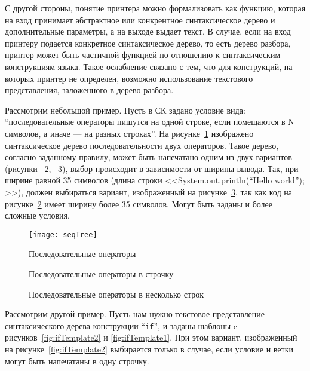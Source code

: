 С другой стороны, понятие принтера можно формализовать как функцию,
которая на вход принимает
абстрактное или конкрентное синтаксическое дерево и дополнительные параметры,
а на выходе выдает текст. В случае, если на вход принтеру подается конкретное
синтаксическое дерево, то есть дерево разбора, принтер может быть частичной
функцией по отношению к синтаксическим конструкциям языка.
Такое ослабление связано
с тем, что для конструкций, на которых принтер не определен, возможно использование
текстового представления, заложенного в дерево разбора.

Рассмотрим небольшой пример.
Пусть в СК задано условие вида: “последовательные операторы пишутся
на одной строке,
если помещаются в N символов, а иначе --- на разных строках”.
На рисунке~\ref{fig:seqImage} изображено синтаксическое дерево
последовательности двух операторов. Такое дерево, согласно заданному
правилу, может быть напечатано одним из
двух вариантов (рисунки ~\ref{fig:seqCode1}, ~\ref{fig:seqCode2}),
выбор происходит в зависимости от ширины вывода. Так, при ширине равной
35 символов (длина строки <<System.out.println(“Hello world”); >>),
должен выбираться вариант, изображенный на рисунке~\ref{fig:seqCode2},
так как код на рисунке~\ref{fig:seqCode1} имеет ширину более 35 символов.
Могут быть заданы и более сложные условия.

\begin{figure}[h!]
	\centering
	\texttt{[image: seqTree]}
	\caption{Последовательные операторы}
	\label{fig:seqImage}
\end{figure}

\begin{figure}[h!]
	\centering
	
	\caption{Последовательные операторы в строчку}
	\label{fig:seqCode1}
\end{figure}

\begin{figure}[h!]
	\centering
	
	\caption{Последовательные операторы в несколько строк}
	\label{fig:seqCode2}
\end{figure}


Рассмотрим другой пример.
Пусть нам нужно текстовое представление синтаксического дерева конструкции
“\lstinline{if}”, и заданы шаблоны c рисунков~\ref{fig:ifTemplate2} и
\ref{fig:ifTemplate1}. При этом вариант, изображенный на
рисунке~\ref{fig:ifTemplate2} выбирается только в случае, если условие и
ветки могут быть напечатаны в одну строчку.

